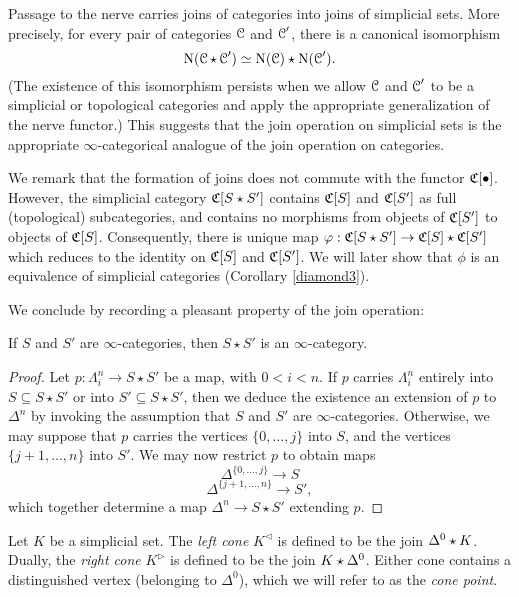 \begin{Didn't Read}
Passage to the nerve carries joins of
categories into joins of simplicial sets. More precisely, for every pair of
categories $\operatorname{\mathcal{C}}$ and $\operatorname{\mathcal{C}}'$, there is
a canonical isomorphism $$\operatorname{N}( \operatorname{\mathcal{C}} \star \operatorname{\mathcal{C}}') \simeq
\operatorname{N}(\operatorname{\mathcal{C}}) \star \operatorname{N}(\operatorname{\mathcal{C}}').$$ (The existence of this
isomorphism persists when we allow $\operatorname{\mathcal{C}}$ and $\operatorname{\mathcal{C}}'$ to be a simplicial or
topological categories and apply the appropriate generalization of
the nerve functor.) This suggests that the join operation on
simplicial sets is the appropriate $\infty$-categorical analogue of
the join operation on categories.

We remark that the formation of joins does not commute with the
functor $\operatorname{\mathfrak{C}}[\bullet]$. However, the simplicial category $\operatorname{\mathfrak{C}}[S \star S']$
contains $\operatorname{\mathfrak{C}}[S]$ and $\operatorname{\mathfrak{C}}[S']$ as full (topological)
subcategories, and contains no morphisms from objects of
$\operatorname{\mathfrak{C}}[S']$ to objects of $\operatorname{\mathfrak{C}}[S]$. Consequently, there is unique map $\varphi: \operatorname{\mathfrak{C}}[S \star S'] \rightarrow \operatorname{\mathfrak{C}}[S] \star \operatorname{\mathfrak{C}}[S']$ which reduces to the identity on
$\operatorname{\mathfrak{C}}[S]$ and $\operatorname{\mathfrak{C}}[S']$. We will later show that $\phi$ is an equivalence of simplicial categories (Corollary \ref{diamond3}).

We conclude by recording a pleasant property of the join
operation:

\begin{proposition}
If $S$ and $S'$ are $\infty$-categories, then $S \star S'$ is an $\infty$-category.
\end{proposition}

\begin{proof}
Let $p: \Lambda^n_i \rightarrow S \star S'$ be a map, with $0 < i
< n$. If $p$ carries $\Lambda^n_i$ entirely into $S \subseteq S
\star S'$ or into $S' \subseteq S \star S'$, then we deduce
the existence an extension of $p$ to $\Delta^n$ by invoking
the assumption that $S$ and $S'$ are $\infty$-categories. Otherwise,
we may suppose that $p$ carries the vertices $\{0, \ldots, j\}$
into $S$, and the vertices $\{ j+1, \ldots, n\}$ into $S'$. 
We may now restrict $p$ to obtain maps
$$ \Delta^{ \{ 0, \ldots, j \} } \rightarrow S$$
$$ \Delta^{ \{ j+1, \ldots, n \} } \rightarrow S',$$
which together determine a map $\Delta^n \rightarrow S \star S'$ extending $p$.
\end{proof}

\begin{notation}
Let $K$ be a simplicial set. The {\it left cone} $K^{\triangleleft}$ is defined to be
the join $\Delta^0 \star K$. Dually, the {\it right cone} $K^{\triangleright}$ is defined to be the join $K \star \Delta^0$. Either cone contains a distinguished vertex (belonging to $\Delta^0$), which we will refer to as the {\it cone point}.
\end{notation}


\end{Didn't Read}
